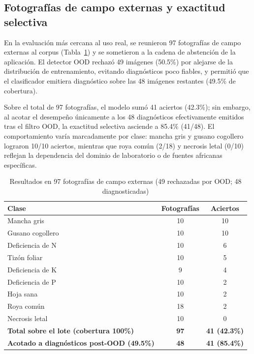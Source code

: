 \documentclass[conference,letterpaper]{IEEEtran}
\begin{document}
\subsection{Fotografías de campo externas y exactitud selectiva}
En la evaluación más cercana al uso real, se reunieron 97 fotografías de campo externas al corpus (Tabla~\ref{tab:campo}) y se sometieron a la cadena de abstención de la aplicación. El detector OOD rechazó 49 imágenes (50.5\%) por alejarse de la distribución de entrenamiento, evitando diagnósticos poco fiables, y permitió que el clasificador emitiera diagnóstico sobre las 48 imágenes restantes (49.5\% de cobertura).

Sobre el total de 97 fotografías, el modelo sumó 41 aciertos (42.3\%); sin embargo, al acotar el desempeño únicamente a los 48 diagnósticos efectivamente emitidos tras el filtro OOD, la exactitud selectiva asciende a 85.4\% (41/48). El comportamiento varía marcadamente por clase: mancha gris y gusano cogollero lograron 10/10 aciertos, mientras que roya común (2/18) y necrosis letal (0/10) reflejan la dependencia del dominio de laboratorio o de fuentes africanas específicas.

\begin{table}[!t]
\caption{Resultados en 97 fotografías de campo externas (49 rechazadas por OOD; 48 diagnosticadas)}
\label{tab:campo}
\centering
\scriptsize
\begin{tabular}{@{}lcc@{}}
\toprule
\textbf{Clase} & \textbf{Fotografías} & \textbf{Aciertos} \\
\midrule
Mancha gris & 10 & 10 \\
Gusano cogollero & 10 & 10 \\
Deficiencia de N & 10 & 6 \\
Tizón foliar & 10 & 5 \\
Deficiencia de K & 9 & 4 \\
Deficiencia de P & 10 & 2 \\
Hoja sana & 10 & 2 \\
Roya común & 18 & 2 \\
Necrosis letal & 10 & 0 \\
\midrule
\textbf{Total sobre el lote (cobertura 100\%)} & \textbf{97} & \textbf{41 (42.3\%)} \\
\textbf{Acotado a diagnósticos post-OOD (49.5\%)} & \textbf{48} & \textbf{41 (85.4\%)} \\
\bottomrule
\end{tabular}
\end{table}
\end{document}
